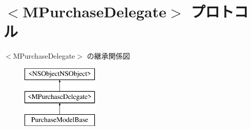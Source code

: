 \hypertarget{protocol_m_purchase_delegate-p}{}\section{$<$M\+Purchase\+Delegate$>$ プロトコル}
\label{protocol_m_purchase_delegate-p}
$<$M\+Purchase\+Delegate$>$ の継承関係図\begin{figure}[H]
\begin{center}
\leavevmode
\includegraphics[height=3.000000cm]{protocol_m_purchase_delegate-p}
\end{center}
\end{figure}
